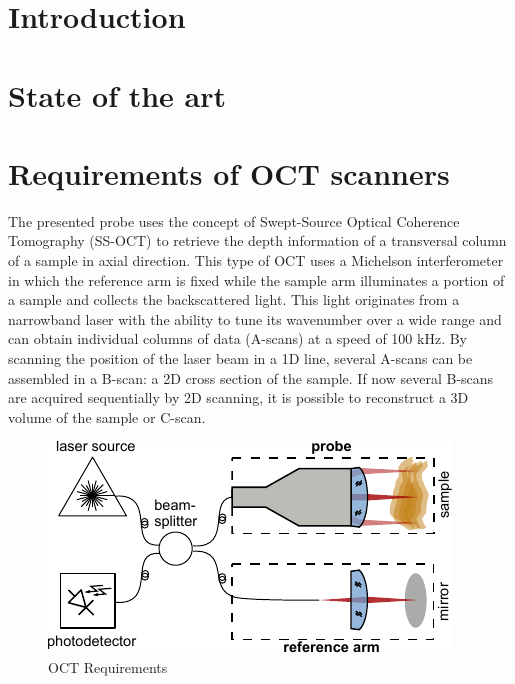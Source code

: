 \documentclass[10pt]{iopart}
\begin{document}
\section{Introduction}

\section{State of the art}

\section{Requirements of OCT scanners}

The presented probe uses the concept of Swept-Source Optical Coherence Tomography (SS-OCT) to retrieve the depth information of a transversal column of a sample in axial direction. This type of OCT uses a Michelson interferometer in which the reference arm is fixed while the sample arm illuminates a portion of a sample and collects the backscattered light. This light originates from a narrowband laser with the ability to tune its wavenumber over a wide range and can obtain individual columns of data (A-scans) at a speed of 100 kHz. By scanning the position of the laser beam in a 1D line, several A-scans can be assembled in a B-scan: a 2D cross section of the sample. If now several B-scans are acquired sequentially by 2D scanning, it is possible to reconstruct a 3D volume of the sample or C-scan.

\begin{figure}[h!]\centering \includegraphics{figures/OCTsetup.pdf}
      \caption{OCT Requirements}
\end{figure}
\end{document}
